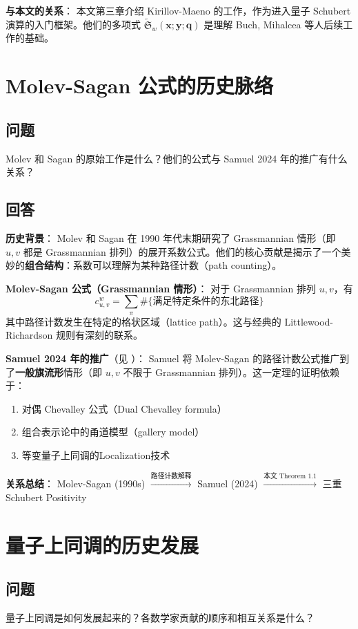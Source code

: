 \textbf{与本文的关系}：
本文第三章介绍 Kirillov-Maeno 的工作，作为进入量子 Schubert 演算的入门框架。他们的多项式 $\widetilde{\mathfrak{S}}_w(\mathbf{x}; \mathbf{y}; \mathbf{q})$ 是理解 Buch, Mihalcea 等人后续工作的基础。

\section{Molev-Sagan 公式的历史脉络}\label{sec:molev-sagan-history}
\subsection{问题}
Molev 和 Sagan 的原始工作是什么？他们的公式与 Samuel 2024 年的推广有什么关系？

\subsection{回答}
\textbf{历史背景}：
Molev 和 Sagan 在 1990 年代末期研究了 Grassmannian 情形（即 $u, v$ 都是 Grassmannian 排列）的展开系数公式。他们的核心贡献是揭示了一个美妙的\textbf{组合结构}：系数可以理解为某种路径计数（path counting）。

\textbf{Molev-Sagan 公式（Grassmannian 情形）}：
对于 Grassmannian 排列 $u, v$，有
$$c^w_{u,v} = \sum_{\pi} \#\{\text{满足特定条件的东北路径}\}$$
其中路径计数发生在特定的格状区域（lattice path）。这与经典的 Littlewood-Richardson 规则有深刻的联系。

\textbf{Samuel 2024 年的推广}（见 \cite{Sa}）：
Samuel 将 Molev-Sagan 的路径计数公式推广到了\textbf{一般旗流形}情形（即 $u, v$ 不限于 Grassmannian 排列）。这一定理的证明依赖于：
\begin{enumerate}
\item 对偶 Chevalley 公式（Dual Chevalley formula）
\item 组合表示论中的甬道模型（gallery model）
\item 等变量子上同调的Localization技术
\end{enumerate}

\textbf{关系总结}：
Molev-Sagan (1990s) $\xrightarrow{\text{路径计数解释}}$ Samuel (2024) $\xrightarrow{\text{本文 Theorem 1.1}}$ 三重 Schubert Positivity

\section{量子上同调的历史发展}\label{sec:quantum-cohomology-history}
\subsection{问题}
量子上同调是如何发展起来的？各数学家贡献的顺序和相互关系是什么？

